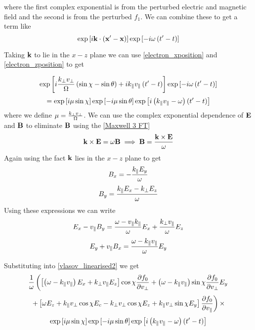 where the first complex exponential is from the perturbed electric and magnetic field and the second is from the perturbed $f_1$. We can combine these to get a term like
\begin{equation}
	\exp \left[i\textbf{k}\cdot \left(\textbf{x}' -\textbf{x} \right)\right] \exp \left[-i\omega \left(t' - t\right)\right]
\end{equation}

Taking $\textbf{k}$ to lie in the $x-z$ plane we can use \eqref{electron_xposition} and \eqref{electron_zposition} to get

\begin{equation*}
	\exp \left[i\frac{k_\perp v_\perp}{\Omega} \left(\sin\chi- \sin\theta\right) +ik_\parallel v_\parallel \left(t' - t\right)\right] \exp \left[-i\omega \left(t' - t\right)\right]
\end{equation*}
\begin{equation}
	= \exp \left[i\mu \sin\chi \right] \exp \left[-i\mu \sin\theta \right] \exp \left[i\left(k_\parallel v_\parallel - \omega\right) \left(t' - t\right)\right]
\end{equation}
where we define $\mu = \frac{k_\perp v_\perp}{\Omega}$. We can use the complex exponential dependence of $\textbf{E}$ and $\textbf{B}$ to eliminate $\textbf{B}$ using the \eqref{Maxwell 3 FT}
\begin{equation}
	\textbf{k} \times \textbf{E} = \omega \textbf{B} \implies \textbf{B} = \frac{\textbf{k} \times \textbf{E}}{\omega}
\end{equation}
Again using the fact $\textbf{k}$ lies in the $x-z$ plane to get
\begin{equation}
	B_x = -\frac{k_\parallel E_y}{\omega}
\end{equation}
\begin{equation}
	B_y = \frac{k_\parallel E_x - k_\perp E_z}{\omega}
\end{equation}
Using these expressions we can write
\begin{equation}
	E_x - v_\parallel B_y = \frac{\omega - v_\parallel k_\parallel}{\omega}E_x + \frac{k_\perp v_\parallel}{\omega}E_z
\end{equation}
\begin{equation}
	E_y + v_\parallel B_x = \frac{\omega - k_\parallel v_\parallel}{\omega}E_y
\end{equation}

Substituting into \eqref{vlasov_linearised2} we get
\begin{equation*}
	\frac{1}{\omega} \left( \left[ \left(\omega-k_\parallel v_\parallel\right)E_x + k_\perp v_\parallel E_z \right]\cos\chi \frac{\partial f_0}{\partial v_\perp} + \left(\omega-k_\parallel v_\parallel\right)\sin\chi \frac{\partial f_0}{\partial v_\perp} E_y \right.
\end{equation*}
\begin{equation*}
	\left. + \left[ \omega E_z + k_\parallel v_\perp\cos\chi E_c - k_\perp v_\perp\cos\chi E_z + k_\parallel v_\perp\sin\chi E_y \right] \frac{\partial f_0}{\partial v_\parallel} \right) \times
\end{equation*}
\begin{equation}
	\exp \left[i\mu \sin\chi \right] \exp \left[-i\mu \sin\theta \right] \exp \left[i\left(k_\parallel v_\parallel - \omega\right) \left(t' - t\right)\right]
\end{equation}

